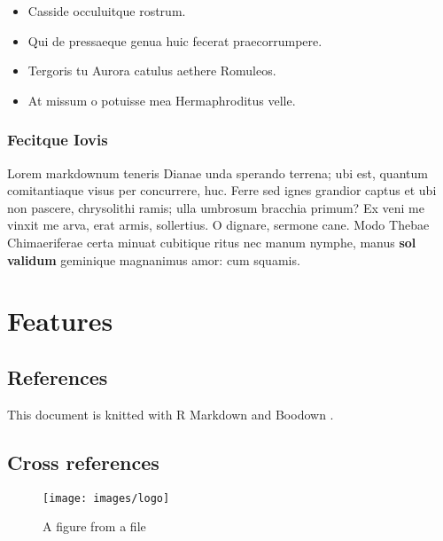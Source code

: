 \documentclass[fleqn,10pt]{article} %
\providecommand{\tightlist}{%
  \setlength{\itemsep}{0pt}\setlength{\parskip}{0pt}}
\begin{document}
\begin{itemize}
\tightlist
\item
  Casside occuluitque rostrum.
\item
  Qui de pressaeque genua huic fecerat praecorrumpere.
\item
  Tergoris tu Aurora catulus aethere Romuleos.
\item
  At missum o potuisse mea Hermaphroditus velle.
\end{itemize}

\hypertarget{fecitque-iovis-1}{%
\subsubsection{Fecitque Iovis}\label{fecitque-iovis-1}}

Lorem markdownum teneris Dianae unda sperando terrena; ubi est, quantum comitantiaque visus per concurrere, huc.
Ferre sed ignes grandior captus et ubi non pascere, chrysolithi ramis; ulla umbrosum bracchia primum?
Ex veni me vinxit me arva, erat armis, sollertius.
O dignare, sermone cane.
Modo Thebae Chimaeriferae certa minuat cubitique ritus nec manum nymphe, manus \textbf{sol validum} geminique magnanimus amor: cum squamis.

\hypertarget{features}{%
\section{Features}\label{features}}

\hypertarget{references}{%
\subsection{References}\label{references}}

This document is knitted with R Markdown and Boodown \citep{Xie2016, Xie2018}.

\hypertarget{cross-references}{%
\subsection{Cross references}\label{cross-references}}

\scriptsize

\begin{figure}

{\centering \texttt{[image: images/logo]} 

}

\caption{A figure from a file}\label{fig:nouveau}
\end{figure}
\end{document}
